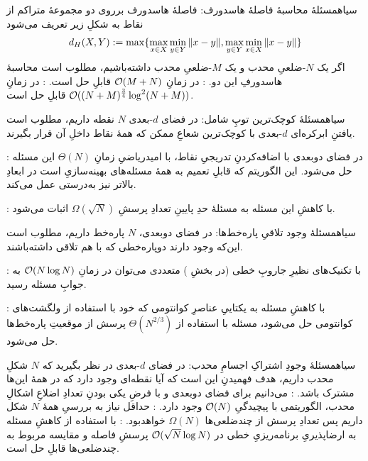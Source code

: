     ‌سیاه{مسئلهٔ محاسبهٔ فاصلهٔ هاسدورف:} فاصلهٔ هاسدورف برروی دو مجموعهٔ متراکم از نقاط به شکلِ زیر تعریف می‌شود
    \begin{equation}
        d_H(X, Y) := \max \{ \max_{x \in X} \min_{y \in Y} \norm{x - y}, \max_{y \in Y} \min_{x \in X} \norm{x - y} \}
    \end{equation}
    اگر یک $N$-ضلعیِ محدب و یک $M$-ضلعیِ محدب داشته‌باشیم، مطلوب است محاسبهٔ هاسدورفِ این دو.  
        : در زمانِ 
        $\mathcal{O}(M + N)$
        قابلِ حل است.
        : در زمانِ
        $\mathcal{O}((N+M)^{\frac{3}{4}} \log^2 (N+M))$
        قابلِ حل است.
    
    ‌سیاه{مسئلهٔ کوچک‌ترین توپِ شامل}: در فضای $d$-بعدی $N$ نقطه داریم، مطلوب است یافتنِ ابرکره‌ای $d$-بعدی با کوچک‌ترین شعاعِ ممکن که همهٔ نقاط داخلِ آن قرار بگیرند.

        : در فضای دوبعدی با اضافه‌کردنِ تدریجیِ نقاط، با امیدریاضیِ زمانِ
        $\Theta(N)$
        این مسئله حل می‌شود. این الگوریتم که قابلِ تعمیم به همهٔ مسئله‌های بهینه‌سازیِ 
        است در ابعادِ بالاتر نیز به‌درستی عمل می‌کند.

        : با کاهشِ این مسئله به مسئلهٔ 
        حدِ پایینِ تعدادِ پرسشِ
        $\Omega(\sqrt{N})$
        اثبات می‌شود.


    ‌سیاه{مسئلهٔ وجود تلاقیِ پاره‌خط‌ها}: در فضای دوبعدی، $N$ پاره‌خط داریم، مطلوب است این‌که وجود دارند دوپاره‌خطی که با هم تلاقی داشته‌باشند.

        : با تکنیک‌های نظیرِ جاروبِ خطی (در بخشِ ) متعددی می‌توان در زمانِ 
        $\mathcal{O}(N\log N)$
        به جوابِ مسئله رسید.

        : با کاهشِ مسئله به یکتاییِ عناصرِ کوانتومی که خود با استفاده از ولگشت‌های کوانتومی حل می‌شود، مسئله با استفاده از
        $\Theta(N^{2/3})$
        پرسش از موقعیتِ پاره‌خط‌ها حل می‌شود.

    ‌سیاه{مسئلهٔ وجودِ اشتراکِ اجسامِ محدب}: در فضای $d$-بعدی در نظر بگیرید که $N$ شکلِ محدب داریم، هدف فهمیدنِ این است که آیا نقطه‌ای وجود دارد که در همهٔ این‌ها مشترک باشد. 
        : می‌دانیم برای فضای دوبعدی و با فرضِ یکی بودنِ تعدادِ اضلاعِ اشکالِ محدب، الگوریتمی با پیچیدگیِ
        $\mathcal{O}(N)$
        وجود دارد.
        : حداقل نیاز به بررسیِ همهٔ $N$ شکل داریم پس تعدادِ پرسش از چندضلعی‌ها 
        $\Omega(N)$
        خواهدبود.
        : با استفاده از کاهشِ مسئله به ارضاپذیریِ برنامه‌ریزیِ خطی در 
        $\mathcal{O}(\sqrt{N}\log N)$
        پرسشِ فاصله و مقایسه مربوط به چندضلعی‌ها قابلِ حل است.

